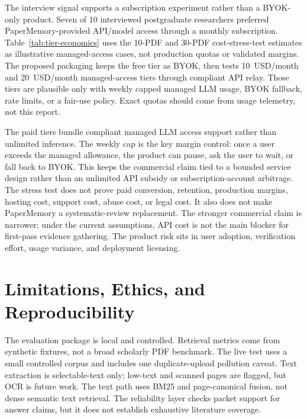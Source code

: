 \documentclass{article}
\begin{document}



The interview signal supports a subscription experiment rather than a BYOK-only product. Seven of 10 interviewed postgraduate researchers preferred PaperMemory-provided API/model access through a monthly subscription. Table~\ref{tab:tier-economics} uses the 10-PDF and 30-PDF cost-stress-test estimates as illustrative managed-access cases, not production quotas or validated margins. The proposed packaging keeps the free tier as BYOK, then tests 10~USD/month and 20~USD/month managed-access tiers through compliant API relay. Those tiers are plausible only with weekly capped managed LLM usage, BYOK fallback, rate limits, or a fair-use policy. Exact quotas should come from usage telemetry, not this report.

The paid tiers bundle compliant managed LLM access support rather than unlimited inference. The weekly cap is the key margin control: once a user exceeds the managed allowance, the product can pause, ask the user to wait, or fall back to BYOK. This keeps the commercial claim tied to a bounded service design rather than an unlimited API subsidy or subscription-account arbitrage. The stress test does not prove paid conversion, retention, production margins, hosting cost, support cost, abuse cost, or legal cost. It also does not make PaperMemory a systematic-review replacement. The stronger commercial claim is narrower: under the current assumptions, API cost is not the main blocker for first-pass evidence gathering. The product risk sits in user adoption, verification effort, usage variance, and deployment licensing.

\section{Limitations, Ethics, and Reproducibility}
\label{sec:limitations-ethics-reproducibility}

The evaluation package is local and controlled. Retrieval metrics come from synthetic fixtures, not a broad scholarly PDF benchmark. The live test uses a small controlled corpus and includes one duplicate-upload pollution caveat. Text extraction is selectable-text only; low-text and scanned pages are flagged, but OCR is future work. The text path uses BM25 and page-canonical fusion, not dense semantic text retrieval. The reliability layer checks packet support for answer claims, but it does not establish exhaustive literature coverage.
\end{document}
